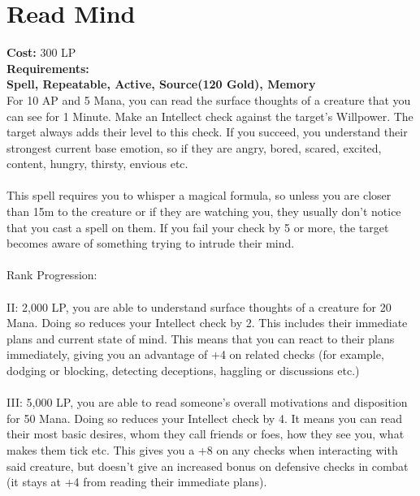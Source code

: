 \section{Read Mind}\label{spell:readMind}
\textbf{Cost:} 300 LP\\
\textbf{Requirements:}\\
\textbf{Spell, Repeatable, Active, Source(120 Gold), Memory}\\
For 10 AP and 5 Mana, you can read the surface thoughts of a creature that you can see for 1 Minute.
Make an Intellect check against the target's Willpower.
The target always adds their level to this check.
If you succeed, you understand their strongest current base emotion, so if they are angry, bored, scared, excited, content, hungry, thirsty, envious etc.\\
\\
This spell requires you to whisper a magical formula, so unless you are closer than 15m to the creature or if they are watching you, they usually don't notice that you cast a spell on them.
If you fail your check by 5 or more, the target becomes aware of something trying to intrude their mind.\\
\\
Rank Progression:\\
\\
II: 2,000 LP, you are able to understand surface thoughts of a creature for 20 Mana.
Doing so reduces your Intellect check by 2.
This includes their immediate plans and current state of mind.
This means that you can react to their plans immediately, giving you an advantage of +4 on related checks (for example, dodging or blocking, detecting deceptions, haggling or discussions etc.)\\
\\
III: 5,000 LP, you are able to read someone's overall motivations and disposition for 50 Mana.
Doing so reduces your Intellect check by 4.
It means you can read their most basic desires, whom they call friends or foes, how they see you, what makes them tick etc.
This gives you a +8 on any checks when interacting with said creature, but doesn't give an increased bonus on defensive checks in combat (it stays at +4 from reading their immediate plans).\\